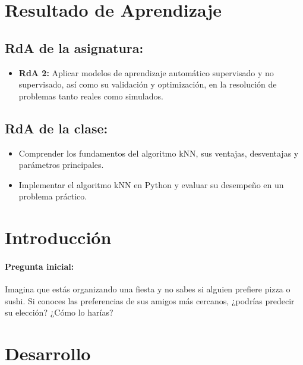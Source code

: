 \documentclass[a4,11pt]{aleph-notas}
\begin{document}
\encabezado

\section*{Resultado de Aprendizaje}

\subsection*{RdA de la asignatura:}
\begin{itemize}[leftmargin=*]
    \item \textbf{RdA 2:} Aplicar modelos de aprendizaje automático supervisado y no supervisado, así como su validación y optimización, en la resolución de problemas tanto reales como simulados.
\end{itemize}

\subsection*{RdA de la clase:}
\begin{itemize}[leftmargin=*]
    \item Comprender los fundamentos del algoritmo kNN, sus ventajas, desventajas y parámetros principales.
    \item Implementar el algoritmo kNN en Python y evaluar su desempeño en un problema práctico.
\end{itemize}

\section*{Introducción}

\paragraph{Pregunta inicial:} 
Imagina que estás organizando una fiesta y no sabes si alguien prefiere pizza o sushi. Si conoces las preferencias de sus amigos más cercanos, ¿podrías predecir su elección? ¿Cómo lo harías?

\section*{Desarrollo}
\end{document}
